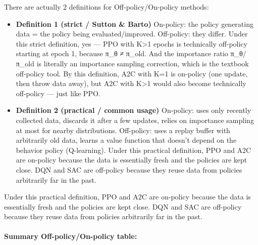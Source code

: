 \documentclass[11pt]{article}
\providecommand{\tightlist}{%
      \setlength{\itemsep}{0pt}\setlength{\parskip}{0pt}}
\begin{document}
There are actually 2 definitions for Off-policy/On-policy methods:

\begin{itemize}
\tightlist
\item
  \textbf{Definition 1 (strict / Sutton \& Barto)} On-policy: the policy
  generating data = the policy being evaluated/improved. Off-policy:
  they differ. Under this strict definition, yes --- PPO with
  K\textgreater1 epochs is technically off-policy starting at epoch 1,
  because π\_θ ≠ π\_old. And the importance ratio π\_θ/π\_old is
  literally an importance sampling correction, which is the textbook
  off-policy tool. By this definition, A2C with K=1 is on-policy (one
  update, then throw data away), but A2C with K\textgreater1 would also
  become technically off-policy --- just like PPO.
\item
  \textbf{Definition 2 (practical / common usage)} On-policy: uses only
  recently collected data, discards it after a few updates, relies on
  importance sampling at most for nearby distributions. Off-policy: uses
  a replay buffer with arbitrarily old data, learns a value function
  that doesn't depend on the behavior policy (Q-learning). Under this
  practical definition, PPO and A2C are on-policy because the data is
  essentially fresh and the policies are kept close. DQN and SAC are
  off-policy because they reuse data from policies arbitrarily far in
  the past.
\end{itemize}

Under this practical definition, PPO and A2C are on-policy because the
data is essentially fresh and the policies are kept close. DQN and SAC
are off-policy because they reuse data from policies arbitrarily far in
the past.

\paragraph{Summary Off-policy/On-policy
table:}\label{summary-off-policyon-policy-table}
\end{document}
